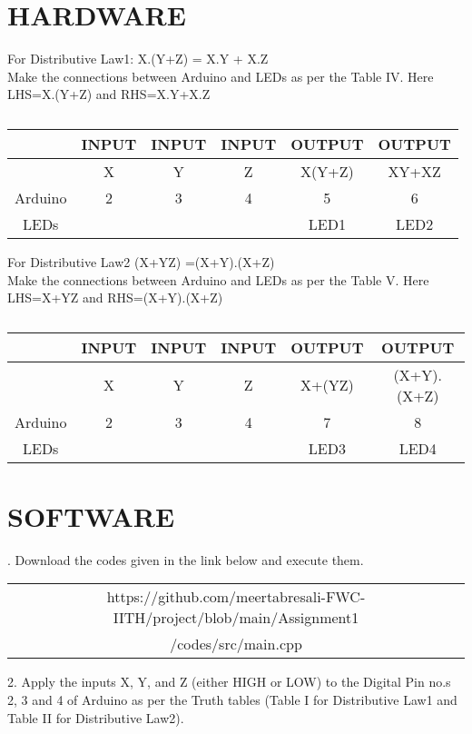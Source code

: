 \documentclass[conference]{IEEEtran}
\begin{document}
\section{HARDWARE}
\begin{flushleft}
For Distributive Law1: X.(Y+Z) = X.Y + X.Z \\
Make the connections between Arduino and LEDs as per the Table IV. Here LHS=X.(Y+Z) and RHS=X.Y+X.Z\\

\begin{table}[h]
\begin{tabular}{|c | c | c | c | c | c |} \hline
 & \textbf{INPUT} & \textbf{INPUT} & \textbf{INPUT} & \textbf{OUTPUT} & \textbf{OUTPUT} \\\hline
 & X & Y & Z & X(Y+Z) & XY+XZ \\ \hline
Arduino & 2 & 3 & 4 & 5 & 6 \\ \hline
LEDs &  &  &  & LED1 & LED2 \\ \hline
\end{tabular}
\caption{\label{tab:widgets}}
\end{table}
\end{flushleft}
\begin{flushleft}
For Distributive Law2 (X+YZ) =(X+Y).(X+Z) \\
Make the connections between Arduino and LEDs as per the Table V. Here LHS=X+YZ and RHS=(X+Y).(X+Z) \\
\end{flushleft}
\begin{table}[h]
\begin{tabular}{|c | c | c | c | c | c |} \hline
 & \textbf{INPUT} & \textbf{INPUT} & \textbf{INPUT} & \textbf{OUTPUT} & \textbf{OUTPUT} \\\hline
 & X & Y & Z & X+(YZ) & (X+Y).(X+Z) \\ \hline
Arduino & 2 & 3 & 4 & 7 & 8 \\ \hline
LEDs &  &  &  & LED3 & LED4 \\ \hline
\end{tabular}
\caption{\label{tab:widgets}}
\end{table}

\section{SOFTWARE}
. Download the codes given in the link below and execute them.\\

\begin{table}[h]
\centering
\begin{tabular}{| c |} \hline
 \rule{0pt}{20pt} https://github.com/meertabresali-FWC-IITH/project/blob/main/Assignment1 \\
 /codes/src/main.cpp \\\hline
\end{tabular}
\end{table}
\begin{flushleft}
2. Apply the inputs X, Y, and Z (either HIGH or LOW) to the Digital Pin no.s 2, 3 and 4 of Arduino as per the Truth tables (Table I for Distributive Law1 and Table II for Distributive Law2).
\end{flushleft}
\end{document}
